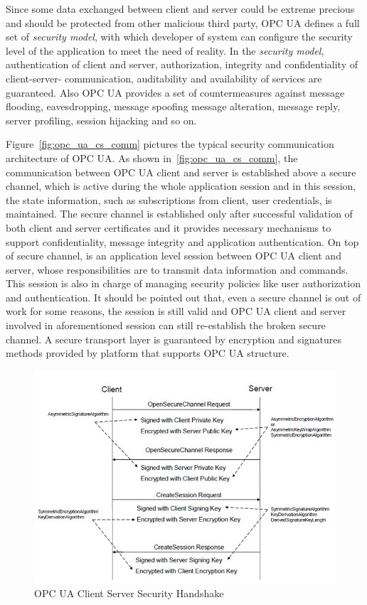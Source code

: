 \documentclass[]{llncs}
\begin{document}
Since some data exchanged between client and server could be extreme precious and should be protected from other malicious third party, OPC UA defines a full set of  \emph{security model}, with which developer of system can configure the security level of the application to meet the need of reality. In the  \emph{security model}, authentication of client and server, authorization, integrity and confidentiality of client-server- communication, auditability and availability of services are guaranteed. Also OPC UA provides a set of countermeasures against message flooding, eavesdropping, message spoofing message alteration, message reply, server profiling, session hijacking and so on\cite{O2}.


Figure~\ref{fig:opc_ua_cs_comm} pictures the typical security communication architecture of OPC UA. As shown in~\ref{fig:opc_ua_cs_comm}, the communication between OPC UA client and server is established above a secure channel, which is active during the whole application session and in this session, the state information, such as subscriptions from client, user credentials, is maintained. The secure channel is established only after successful validation of both client and server certificates and it provides necessary mechanisms to support confidentiality, message integrity and application authentication. On top of secure channel, is an application level session between OPC UA client and server, whose responsibilities are to transmit data information and commands. This session is also in charge of managing security policies like user authorization and authentication. It should be pointed out that, even a secure channel is out of work for some reasons, the session is still valid and OPC UA client and server involved in aforementioned session can still re-establish the broken secure channel. A secure transport layer is guaranteed by encryption and signatures methods provided by platform that supports OPC UA structure.

\begin{figure}[!htb]
	\centering
	\includegraphics[width=1\textwidth]{opc_ua_shs.jpg}
		\caption[ ]{OPC UA Client Server Security Handshake\cite{O2}}
	\label{fig:opc_ua_cs_shs}
\end{figure}
\end{document}
